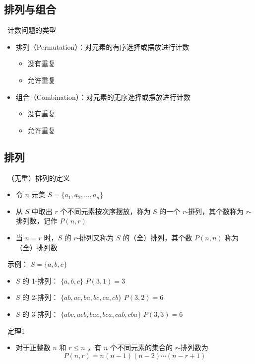 \documentclass[UTF8]{report}
\theoremstyle{MyLineTheoremStyle} %
\theoremstyle{MyBlockTheoremStyle} %
\theoremstyle{MySubsubsectionStyle} %
\begin{document}
\subsection{排列与组合}
\textbullet\ 计数问题的类型
\begin{itemize}
    \item 排列（Permutation）：对元素的有序选择或摆放进行计数
    \begin{itemize}
        \item 没有重复
        \item 允许重复
    \end{itemize}
    \item 组合（Combination）：对元素的无序选择或摆放进行计数
    \begin{itemize}
        \item 没有重复
        \item 允许重复
    \end{itemize}
\end{itemize}

\subsection{排列}
\textbullet\ （无重）排列的定义
\begin{itemize}
    \item 令 $n$ 元集 $S = \{a_1, a_2, \ldots , a_n\}$
    \item 从 $S$ 中取出 $r$ 个不同元素按次序摆放，称为 $S$ 的一个 $r$-排列，其个数称为 $r$-排列数，记作 $P(n, r)$
    \item 当 $n = r$ 时，$S$ 的 $r$-排列又称为 $S$ 的（全）排列，其个数 $P(n, n)$ 称为（全）排列数
\end{itemize}

\textbullet\ 示例： $S = \{a, b, c\}$
\begin{itemize}
    \item $S$ 的 1-排列： $\{a, b, c\}$ $P(3,1) = 3$
    \item $S$ 的 2-排列： $\{ab, ac, ba, bc, ca, cb\}$ $P(3,2) = 6$
    \item $S$ 的 3-排列： $\{abc, acb, bac, bca, cab, cba\}$ $P(3,3) = 6$
\end{itemize}

\textbullet\ 定理1
\begin{itemize}
    \item 对于正整数 $n$ 和 $r \leq n$ ，有 $n$ 个不同元素的集合的 $r$-排列数为
    \[
    P(n, r) = n (n - 1) (n - 2) \cdots (n - r + 1)
    \]
\end{itemize}
\end{document}
